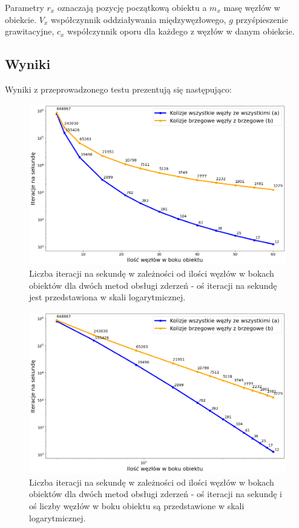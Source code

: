 \documentclass[12pt, letterpaper]{report}
\begin{document}
    Parametry $r_x$ oznaczają pozycję początkową obiektu a $m_x$ masę węzłów w obiekcie.
    $V_x$ współczynnik oddziaływania międzywęzłowego, $g$ przyśpieszenie grawitacyjne, 
    $c_x$ współczynnik oporu dla każdego z węzłów w danym obiekcie.

    \clearpage
    \subsection{Wyniki}
    Wyniki z przeprowadzonego testu prezentują się następująco:
    \begin{figure}[H]
        \centering
        \includegraphics[width=15cm]{performance_side_size}
        \caption{
            Liczba iteracji na sekundę w zależności od 
            ilości węzłów w bokach obiektów dla dwóch metod obsługi zderzeń -
            oś iteracji na sekundę jest przedstawiona w skali logarytmicznej.
        }
    \end{figure}

    \begin{figure}[H]
        \centering
        \includegraphics[width=15cm]{performance_side_size_log_log}
        \caption{
            Liczba iteracji na sekundę w zależności od 
            ilości węzłów w bokach obiektów dla dwóch metod obsługi zderzeń -
            oś iteracji na sekundę i oś liczby węzłów w boku obiektu są przedstawione w skali logarytmicznej.
        }
    \end{figure}
\end{document}
